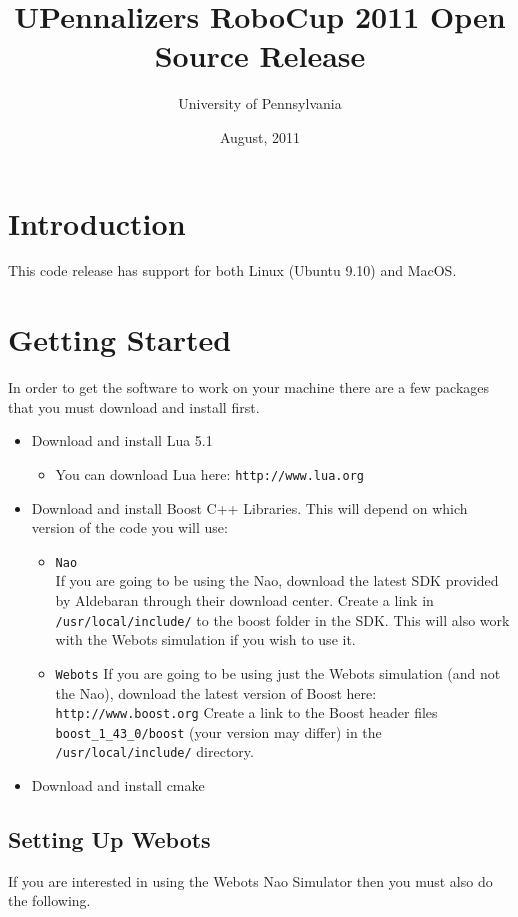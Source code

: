 \documentclass{article}
\begin{document}
\title{UPennalizers RoboCup 2011 Open Source Release}
\date{August, 2011}
\author{University of Pennsylvania}
\maketitle


\section{Introduction}
  This code release has support for both Linux (Ubuntu 9.10) and MacOS.

\section{Getting Started}
  In order to get the software to work on your machine there are a few packages that you must download and install first.

  \begin{itemize}
    \item Download and install Lua 5.1
    \begin{itemize}
      \item You can download Lua here: \texttt{http://www.lua.org}
    \end{itemize}
    \item Download and install Boost C++ Libraries. This will depend on which version of the code you will use:
    \begin{itemize}
      \item \texttt{Nao} \\
        If you are going to be using the Nao, download the latest SDK provided by Aldebaran through their download center. Create a link in \texttt{/usr/local/include/} to the boost folder in the SDK. This will also work with the Webots simulation if you wish to use it.
      \item \texttt{Webots}
        If you are going to be using just the Webots simulation (and not the Nao), download the latest version of Boost here:\\
        \texttt{http://www.boost.org}
        Create a link to the Boost header files \texttt{boost\_1\_43\_0/boost} (your version may differ) in the \texttt{/usr/local/include/} directory.
    \end{itemize}
    \item Download and install cmake
  \end{itemize}

  \subsection{Setting Up Webots}
    If you are interested in using the Webots Nao Simulator then you must also do the following.
\end{document}
